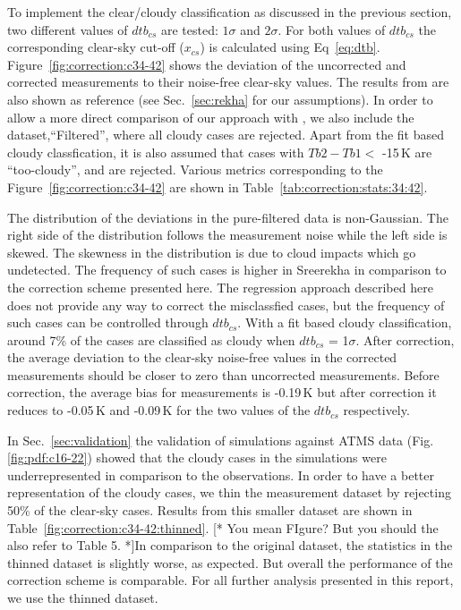 \documentclass[12pt]{article}
\begin{document}
To implement the clear/cloudy classification as discussed in the previous
section, two different values of $dtb_{cs}$ are tested: $1\sigma$ and
$2\sigma$. For both values of $dtb_{cs}$ the corresponding clear-sky cut-off
($x_{cs}$) is calculated using Eq~\ref{eq:dtb}.
Figure~\ref{fig:correction:c34-42} shows the deviation of the uncorrected and
corrected measurements to their noise-free clear-sky values. The results from
\cite{rekha2012potential} are also shown as reference (see Sec.~\ref{sec:rekha}
for our assumptions). In order to allow a more direct comparison of our
approach with \cite{rekha2012potential}, we also include the
dataset,``Filtered'', where all cloudy cases are rejected. Apart from the fit
based cloudy classfication, it is also assumed that cases with $Tb2-Tb1 < $
-15\,K are ``too-cloudy'', and are rejected. Various metrics corresponding to
the Figure~\ref{fig:correction:c34-42} are shown in
Table~\ref{tab:correction:stats:34:42}.

The distribution of the deviations in the pure-filtered data is non-Gaussian. The
right side of the distribution follows the measurement noise while the left
side is skewed. The skewness in the distribution is due to cloud impacts which
go undetected. The frequency of such cases is higher in Sreerekha in comparison to the correction scheme presented here. The regression approach described here does not provide any way to correct the misclassfied cases, but the frequency of such cases can be controlled through $dtb_{cs}$. With a fit based cloudy classification, around 7\% of the cases are classified as cloudy when $dtb_{cs}$
= 1$\sigma$.  After correction, the average deviation to the clear-sky noise-free
values in the corrected measurements should be closer to zero than uncorrected
measurements. Before correction, the average bias for measurements is -0.19\,K
but after correction it reduces to -0.05\,K and -0.09\,K for the two values of
the $dtb_{cs}$ respectively. 

In Sec.~\ref{sec:validation} the validation of simulations against ATMS data
(Fig.\ref{fig:pdf:c16-22}) showed that the cloudy cases in the simulations were
underrepresented in comparison to the observations. In order to have a better
representation of the cloudy cases, we thin the measurement dataset by
rejecting 50\% of the clear-sky cases. Results from this smaller dataset are
shown in Table~\ref{fig:correction:c34-42:thinned}. [* You mean FIgure? But you
should the also refer to Table 5. *]In comparison to the
original dataset, the statistics in the thinned dataset is slightly worse, as
expected. But overall the performance of the correction scheme is comparable.
For all further analysis presented in this report, we use the thinned dataset.
%
\end{document}
